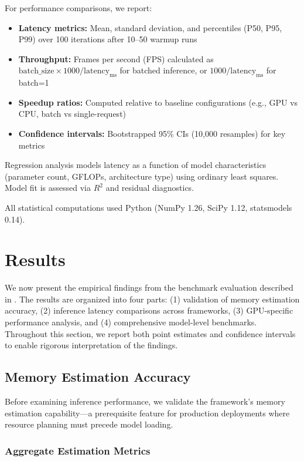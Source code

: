 \documentclass[10pt,twocolumn,a4paper]{article}
\theoremstyle{definition}
\theoremstyle{plain}
\begin{document}
For performance comparisons, we report:
\begin{itemize}
    \item \textbf{Latency metrics:} Mean, standard deviation, and percentiles (P50, P95, P99) over 100 iterations after 10--50 warmup runs
    \item \textbf{Throughput:} Frames per second (FPS) calculated as $\text{batch\_size} \times 1000 / \text{latency}_{\text{ms}}$ for batched inference, or $1000 / \text{latency}_{\text{ms}}$ for batch=1
    \item \textbf{Speedup ratios:} Computed relative to baseline configurations (e.g., GPU vs CPU, batch vs single-request)
    \item \textbf{Confidence intervals:} Bootstrapped 95\% CIs (10,000 resamples) for key metrics
\end{itemize}

Regression analysis models latency as a function of model characteristics (parameter count, GFLOPs, architecture type) using ordinary least squares. Model fit is assessed via $R^2$ and residual diagnostics.

All statistical computations used Python (NumPy 1.26, SciPy 1.12, statsmodels 0.14).

\section{Results}
\label{sec:results}

We now present the empirical findings from the benchmark evaluation described in . The results are organized into four parts: (1) validation of memory estimation accuracy, (2) inference latency comparisons across frameworks, (3) GPU-specific performance analysis, and (4) comprehensive model-level benchmarks. Throughout this section, we report both point estimates and confidence intervals to enable rigorous interpretation of the findings.

\subsection{Memory Estimation Accuracy}

Before examining inference performance, we validate the framework's memory estimation capability---a prerequisite feature for production deployments where resource planning must precede model loading.

\subsubsection{Aggregate Estimation Metrics}
\end{document}
